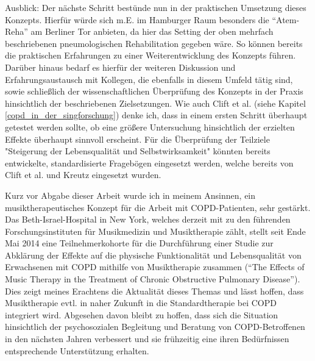 

Ausblick: 
Der nächste Schritt bestünde nun in der praktischen Umsetzung dieses Konzepts. Hierfür würde sich m.E. im Hamburger Raum besonders die "`Atem-Reha"' am Berliner Tor anbieten, da hier das Setting der oben mehrfach beschriebenen pneumologischen Rehabilitation gegeben wäre. So können bereits die praktischen Erfahrungen zu einer Weiterentwicklung des Konzepts führen. Darüber hinaus bedarf es hierfür der weiteren Diskussion und Erfahrungsaustausch mit Kollegen, die ebenfalls in diesem Umfeld tätig sind, sowie schließlich der wissenschaftlichen Überprüfung des Konzepts in der Praxis hinsichtlich der beschriebenen Zielsetzungen. Wie auch Clift et al. (siehe Kapitel \ref{copd_in_der_singforschung}) denke ich, dass in einem ersten Schritt überhaupt getestet werden sollte, ob eine größere Untersuchung hinsichtlich der erzielten Effekte überhaupt sinnvoll erscheint. Für die Überprüfung der Teilziele "Steigerung der Lebensqualität und Selbstwirksamkeit" könnten bereits entwickelte, standardisierte Fragebögen eingesetzt werden, welche bereits von Clift et al. und Kreutz eingesetzt wurden.

Kurz vor Abgabe dieser Arbeit wurde ich in meinem Ansinnen, ein musiktherapeutisches Konzept für die Arbeit mit COPD-Patienten, sehr gestärkt. Das Beth-Israel-Hospital in New York, welches derzeit mit zu den führenden Forschungsinstituten für Musikmedizin und Musiktherapie zählt, stellt seit Ende Mai 2014 eine Teilnehmerkohorte für die Durchführung einer Studie zur Abklärung der Effekte auf die physische Funktionalität und Lebensqualität von Erwachsenen mit COPD mithilfe von Musiktherapie zusammen ("`The Effects of Music Therapy in the Treatment of Chronic Obstructive Pulmonary Disease"'). Dies zeigt meines Erachtens die Aktualität dieses Themas und lässt hoffen, dass Musiktherapie evtl. in naher Zukunft in die Standardtherapie bei COPD integriert wird. Abgesehen davon bleibt zu hoffen, dass sich die Situation hinsichtlich der psychosozialen Begleitung und Beratung von COPD-Betroffenen in den nächsten Jahren verbessert und sie frühzeitig eine ihren Bedürfnissen entsprechende Unterstützung erhalten.

